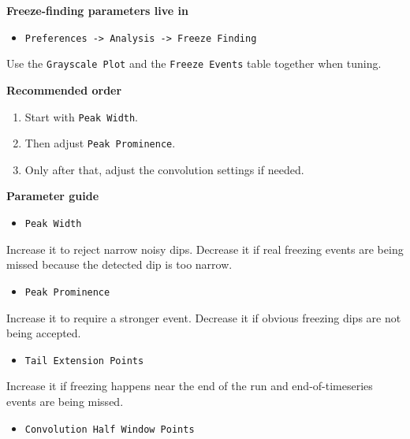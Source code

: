 \documentclass[
  9pt,
  letterpaper,
  oneside,
  open=any,
  DIV=15,
  parskip=half-,
  headings=big,
  numbers=noenddot
]{scrbook}
\newcommand{\manuallead}[1]{%
  \vspace{0.15em}%
  {\sffamily\bfseries\color{ManualBlue}#1}\par\nobreak\vspace{0.05em}%
}
\begin{document}
\manuallead{Freeze-finding parameters live in}

\begin{itemize}[leftmargin=*,itemsep=0.35em,topsep=0.4em]
\item \texttt{Preferences -> Analysis -> Freeze Finding}
\end{itemize}

Use the \texttt{Grayscale Plot} and the \texttt{Freeze Events} table together when tuning.


\manuallead{Recommended order}

\begin{enumerate}[leftmargin=*,itemsep=0.35em,topsep=0.4em]
\item Start with \texttt{Peak Width}.
\item Then adjust \texttt{Peak Prominence}.
\item Only after that, adjust the convolution settings if needed.
\end{enumerate}

\manuallead{Parameter guide}

\begin{itemize}[leftmargin=*,itemsep=0.35em,topsep=0.4em]
\item \texttt{Peak Width}
\end{itemize}

Increase it to reject narrow noisy dips. Decrease it if real freezing events are being missed because the detected dip is too narrow.


\begin{itemize}[leftmargin=*,itemsep=0.35em,topsep=0.4em]
\item \texttt{Peak Prominence}
\end{itemize}

Increase it to require a stronger event. Decrease it if obvious freezing dips are not being accepted.


\begin{itemize}[leftmargin=*,itemsep=0.35em,topsep=0.4em]
\item \texttt{Tail Extension Points}
\end{itemize}

Increase it if freezing happens near the end of the run and end-of-timeseries events are being missed.


\begin{itemize}[leftmargin=*,itemsep=0.35em,topsep=0.4em]
\item \texttt{Convolution Half Window Points}
\end{itemize}
\end{document}
